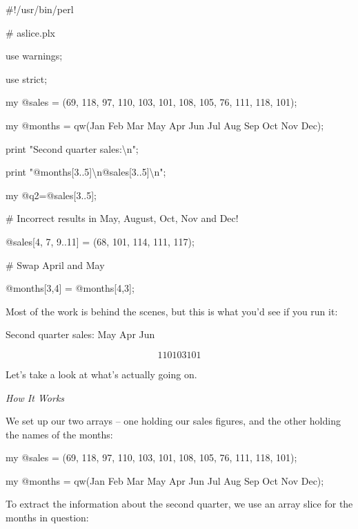 \documentclass[a4paper,11pt]{book}
\begin{document}
\noindent 

\noindent 

\noindent \#!/usr/bin/perl

\noindent \# aslice.plx

\noindent use warnings;

\noindent use strict;

\noindent 

\noindent my @sales = (69, 118, 97, 110, 103, 101, 108, 105, 76, 111, 118, 101);

\noindent my @months = qw(Jan Feb Mar May Apr Jun Jul Aug Sep Oct Nov Dec);

\noindent 

\noindent print "Second quarter sales:\textbackslash n";

\noindent print "@months[3..5]\textbackslash n@sales[3..5]\textbackslash n";

\noindent my @q2=@sales[3..5];

\noindent 

\noindent \# Incorrect results in May, August, Oct, Nov and Dec!

\noindent @sales[4, 7, 9..11] = (68, 101, 114, 111, 117);

\noindent 

\noindent \# Swap April and May

\noindent @months[3,4] = @months[4,3];

\noindent 

\noindent Most of the work is behind the scenes, but this is what you'd see if you run it:

\noindent 

\noindent Second quarter sales: May Apr Jun

\[110 103 101\] 


\noindent Let's take a look at what's actually going on.

\noindent 

\noindent \textit{How It Works}

\noindent We set up our two arrays -- one holding our sales figures, and the other holding the names of the months:

\noindent 

\noindent my @sales = (69, 118, 97, 110, 103, 101, 108, 105, 76, 111, 118, 101);

\noindent my @months = qw(Jan Feb Mar May Apr Jun Jul Aug Sep Oct Nov Dec);

\noindent 

\noindent To extract the information about the second quarter, we use an array slice for the months in question:
\end{document}
